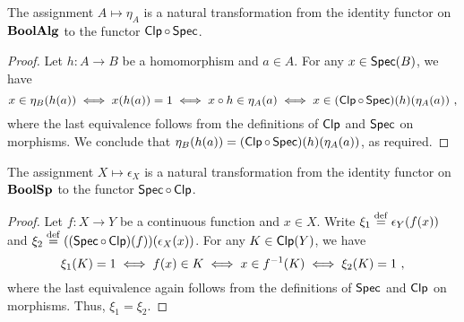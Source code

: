 \begin{proposition}\label{eta is natural transformation}
    The assignment $A \mapsto \eta_A$ is a natural transformation from the
    identity functor on $\mathbf{BoolAlg}$ to the functor $\operatorname*{\mathsf{Clp}} \circ \operatorname*{\mathsf{Spec}}$.
\end{proposition}
\begin{proof}
    Let $h \colon A \to B$ be a homomorphism and $a \in A$. For any $x \in
    \operatorname*{\mathsf{Spec}}(B)$, we have
    \[ x \in \eta_B(h(a)) \iff x(h(a)) = 1 \iff x \circ h \in \eta_A(a) \iff
    x \in (\operatorname*{\mathsf{Clp}} \circ \operatorname*{\mathsf{Spec}})(h)(\eta_A(a)) \ , \]
    where the last equivalence follows from the definitions of $\operatorname*{\mathsf{Clp}}$ and
    $\operatorname*{\mathsf{Spec}}$ on morphisms. We conclude that $\eta_B(h(a)) = (\operatorname*{\mathsf{Clp}} \circ
    \operatorname*{\mathsf{Spec}})(h)(\eta_A(a))$, as required.
\end{proof}

\begin{proposition}\label{epsilon is natural transformation}
    The assignment $X \mapsto \epsilon_X$ is a natural transformation from the
    identity functor on $\mathbf{BoolSp}$ to the functor $\operatorname*{\mathsf{Spec}} \circ \operatorname*{\mathsf{Clp}}$.
\end{proposition}
\begin{proof}
    Let $f \colon X \to Y$ be a continuous function and $x \in X$. Write $\xi_1
    \stackrel{\mathrm{def}}{=} \epsilon_Y(f(x))$ and $\xi_2 \stackrel{\mathrm{def}}{=} ((\operatorname*{\mathsf{Spec}} \circ
    \operatorname*{\mathsf{Clp}})(f))(\epsilon_X(x))$. For any $K \in \operatorname*{\mathsf{Clp}}(Y)$, we have
    \[ \xi_1(K) = 1 \iff f(x) \in K \iff x \in f^{-1}(K) \iff
    \xi_2(K) = 1 \ , \]
    where the last equivalence again follows from the definitions of $\operatorname*{\mathsf{Spec}}$
    and $\operatorname*{\mathsf{Clp}}$ on morphisms. Thus, $\xi_1 = \xi_2$.
\end{proof}

